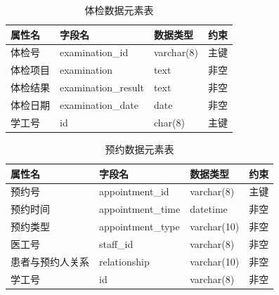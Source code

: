 \documentclass{article}
\begin{document}
\begin{table}[H]
    \centering
    \begin{tabularx}{\textwidth}{|>{\raggedright\arraybackslash}X|>{\raggedright\arraybackslash}X|>{\raggedright\arraybackslash}X|>{\raggedright\arraybackslash}X|}
    \toprule
    \textbf{属性名} & \textbf{字段名} & \textbf{数据类型} & \textbf{约束} \\ \midrule
    体检号 & examination\_id & varchar(8) & 主键 \\ \midrule
    体检项目 & examination & text & 非空 \\ \midrule
    体检结果 & examination\_result & text & 非空 \\ \midrule
    体检日期 & examination\_date & date & 非空 \\ \midrule
    学工号 & id & char(8) & 主键 \\ \bottomrule
    \end{tabularx}
    \caption{体检数据元素表}
    \label{tab:examination_elements}
\end{table}

\begin{table}[H]
    \centering
    \begin{tabularx}{\textwidth}{|>{\raggedright\arraybackslash}X|>{\raggedright\arraybackslash}X|>{\raggedright\arraybackslash}X|>{\raggedright\arraybackslash}X|}
    \toprule
    \textbf{属性名} & \textbf{字段名} & \textbf{数据类型} & \textbf{约束} \\ \midrule
    预约号 & appointment\_id & varchar(8) & 主键 \\ \midrule
    预约时间 & appointment\_time & datetime & 非空 \\ \midrule
    预约类型 & appointment\_type & varchar(10) & 非空 \\ \midrule
    医工号 & staff\_id & varchar(8) & 非空 \\ \midrule
    患者与预约人关系 & relationship & varchar(10) & 非空 \\ \midrule
    学工号 & id & varchar(8) & 非空 \\ \bottomrule
    \end{tabularx}
    \caption{预约数据元素表}
    \label{tab:appointment_elements}
\end{table}
\end{document}
